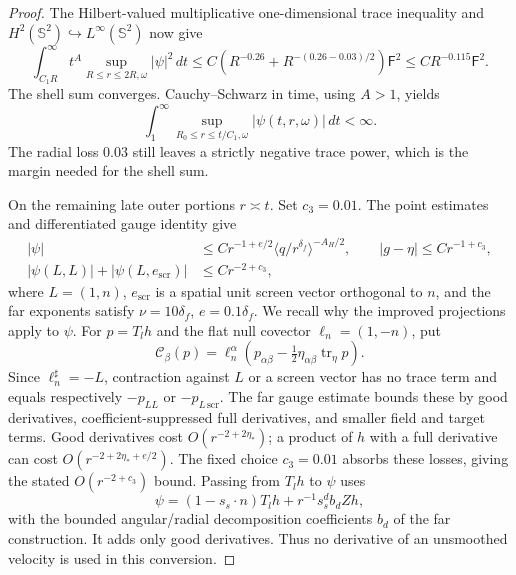 \begin{proof}
The Hilbert-valued multiplicative one-dimensional trace inequality and
$H^2(\mathbb S^2)\hookrightarrow L^\infty(\mathbb S^2)$ now give
\begin{equation}\label{cmp:trace-supremum}
 \int_{C_1R}^{\infty}t^A
       \sup_{R\leq r\leq2R,\omega}|\psi|^2\,dt
 \leq C\left(R^{-0.26}+R^{-(0.26-0.03)/2}\right)\mathsf F^2
 \leq CR^{-0.115}\mathsf F^2.
\end{equation}
The shell sum converges. Cauchy--Schwarz in time, using $A>1$, yields
\begin{equation}\label{cmp:timelike-cone-integral}
 \int_1^\infty
     \sup_{R_0\leq r\leq t/C_1,\omega}|\psi(t,r,\omega)|\,dt
 <\infty.
\end{equation}
The radial loss $0.03$ still leaves a strictly negative trace power,
which is the margin needed for the shell sum.

On the remaining late outer portions $r\asymp t$. Set $c_3=0.01$.
The point estimates and differentiated gauge identity give
\begin{equation}\label{cmp:far-point}
 \begin{aligned}
 |\psi|&\leq Cr^{-1+e/2}
                   \langle q/r^{\delta_f}\rangle^{-A_H/2},\qquad
 |g-\eta|\leq Cr^{-1+c_3},\\
 |\psi(L,L)|+|\psi(L,e_{\mathrm{scr}})|&\leq Cr^{-2+c_3},
 \end{aligned}
\end{equation}
where $L=(1,n)$, $e_{\mathrm{scr}}$ is a spatial unit screen vector
orthogonal to $n$, and the far exponents satisfy
$\nu=10\delta_f$, $e=0.1\delta_f$. We recall why the improved
projections apply to $\psi$. For $p=T_lh$ and the flat null covector
$\ell_n=(1,-n)$, put
\[
 \mathcal C_\beta(p)
  =\ell_n^\alpha
       \left(p_{\alpha\beta}
                    -\tfrac12\eta_{\alpha\beta}\operatorname{tr}_\eta p\right).
\]
Since $\ell_n^\sharp=-L$, contraction against $L$ or a screen vector
has no trace term and equals respectively $-p_{LL}$ or
$-p_{L\,\mathrm{scr}}$. The far gauge estimate bounds these by good
derivatives, coefficient-suppressed full derivatives, and smaller field
and target terms. Good derivatives cost $O(r^{-2+2\eta_*})$; a product
of $h$ with a full derivative can cost
$O(r^{-2+2\eta_*+e/2})$. The fixed choice $c_3=0.01$ absorbs these
losses, giving the stated $O(r^{-2+c_3})$ bound. Passing from $T_lh$
to $\psi$ uses
\[
 \psi=(1-s_s\cdot n)T_lh+r^{-1}s_s^d b_dZh,
\]
with the bounded angular/radial decomposition coefficients $b_d$ of
the far construction. It adds only good derivatives. Thus no derivative
of an unsmoothed velocity is used in this conversion.


\end{proof}
